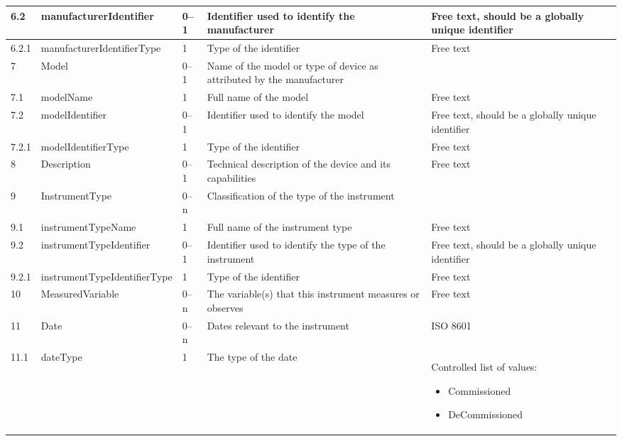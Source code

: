 \documentclass[titlepage=true,twoside=false,DIV=13]{scrartcl}
\begin{document}
\begin{longtable}{|l|l|l|p{}|p{\valcolw}|}
  6.2   & manufacturerIdentifier       & 0--1
        & Identifier used to identify the manufacturer
        & Free text, should be a globally unique identifier \\
  \hline
  6.2.1 & manufacturerIdentifierType   & 1
        & Type of the identifier & Free text \\
  \hline
  7     & Model                        & 0--1
        & Name of the model or type of device as attributed by the
          manufacturer
        & \\
  \hline
  7.1   & modelName                    & 1
        & Full name of the model & Free text \\
  \hline
  7.2   & modelIdentifier              & 0--1
        & Identifier used to identify the model
        & Free text, should be a globally unique identifier \\
  \hline
  7.2.1 & modelIdentifierType          & 1
        & Type of the identifier & Free text \\
  \hline
  8     & Description                  & 0--1
        & Technical description of the device and its capabilities
        & Free text \\
  \hline
  9     & InstrumentType               & 0--n
        & Classification of the type of the instrument & \\
  \hline
  9.1   & instrumentTypeName           & 1
        & Full name of the instrument type & Free text \\
  \hline
  9.2   & instrumentTypeIdentifier     & 0--1
        & Identifier used to identify the type of the instrument
        & Free text, should be a globally unique identifier \\
  \hline
  9.2.1 & instrumentTypeIdentifierType & 1
        & Type of the identifier & Free text \\
  \hline
  10    & MeasuredVariable             & 0--n
        & The variable(s) that this instrument measures or observes
        & Free text \\
  \hline
  11    & Date                         & 0--n
        & Dates relevant to the instrument & ISO 8601 \\
  \hline
  11.1  & dateType                     & 1
        & The type of the date
        & \begin{minipage}[t]{\valcolw}
            Controlled list of values:
            \begin{itemize}[nosep,leftmargin=3.5ex]
            \item Commissioned
            \item DeCommissioned

\end{itemize}
\end{minipage}
\end{longtable}
\end{document}
